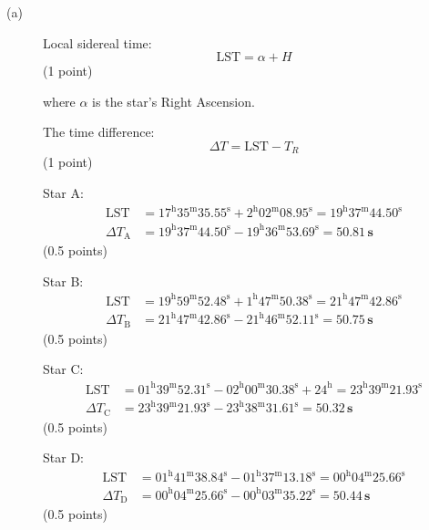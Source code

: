 \begin{description}
\item[(a)] Local sidereal time:
  \[ \mathrm{LST} = \alpha + H \]
  \hfill(1 point)

  where $\alpha$ is the star's Right Ascension.

  The time difference:
  \[ \Delta T = \mathrm{LST} - T_R \]
  \hfill(1 point)

  Star A:
  \begin{align*}
    \mathrm{LST} &= 17^{\mathrm{h}}35^{\mathrm{m}}35.55^{\mathrm{s}}
      + 2^{\mathrm{h}}02^{\mathrm{m}}08.95^{\mathrm{s}}
      = 19^{\mathrm{h}}37^{\mathrm{m}}44.50^{\mathrm{s}} \\
    \Delta T_{\mathrm{A}} &= 19^{\mathrm{h}}37^{\mathrm{m}}44.50^{\mathrm{s}}
      - 19^{\mathrm{h}}36^{\mathrm{m}}53.69^{\mathrm{s}}
      = \mathbf{50.81\,s}
  \end{align*}
  \hfill(0.5 points)

  Star B:
  \begin{align*}
    \mathrm{LST} &= 19^{\mathrm{h}}59^{\mathrm{m}}52.48^{\mathrm{s}}
      + 1^{\mathrm{h}}47^{\mathrm{m}}50.38^{\mathrm{s}}
      = 21^{\mathrm{h}}47^{\mathrm{m}}42.86^{\mathrm{s}} \\
    \Delta T_{\mathrm{B}} &= 21^{\mathrm{h}}47^{\mathrm{m}}42.86^{\mathrm{s}}
      - 21^{\mathrm{h}}46^{\mathrm{m}}52.11^{\mathrm{s}}
      = \mathbf{50.75\,s}
  \end{align*}
  \hfill(0.5 points)

  Star C:
  \begin{align*}
    \mathrm{LST} &= 01^{\mathrm{h}}39^{\mathrm{m}}52.31^{\mathrm{s}}
      - 02^{\mathrm{h}}00^{\mathrm{m}}30.38^{\mathrm{s}} + 24^{\mathrm{h}}
      = 23^{\mathrm{h}}39^{\mathrm{m}}21.93^{\mathrm{s}} \\
    \Delta T_{\mathrm{C}} &= 23^{\mathrm{h}}39^{\mathrm{m}}21.93^{\mathrm{s}}
      - 23^{\mathrm{h}}38^{\mathrm{m}}31.61^{\mathrm{s}}
      = \mathbf{50.32\,s}
  \end{align*}
  \hfill(0.5 points)

  Star D:
  \begin{align*}
    \mathrm{LST} &= 01^{\mathrm{h}}41^{\mathrm{m}}38.84^{\mathrm{s}}
      - 01^{\mathrm{h}}37^{\mathrm{m}}13.18^{\mathrm{s}}
      = 00^{\mathrm{h}}04^{\mathrm{m}}25.66^{\mathrm{s}} \\
    \Delta T_{\mathrm{D}} &= 00^{\mathrm{h}}04^{\mathrm{m}}25.66^{\mathrm{s}}
      - 00^{\mathrm{h}}03^{\mathrm{m}}35.22^{\mathrm{s}}
      = \mathbf{50.44\,s}
  \end{align*}
  \hfill(0.5 points)


\end{description}
